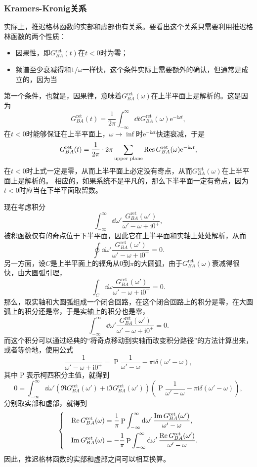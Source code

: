 \documentclass[hyperref, UTF8, a4paper]{ctexart}
\DeclareMathOperator{\primevalue}{P}
\newcommand*{\ii}{\mathrm{i}}
\newcommand*{\ee}{\mathrm{e}}
\newenvironment{bigcase}{\left\{\quad\begin{aligned}}{\end{aligned}\right.}
\begin{document}
\subsubsection{Kramers-Kronig关系}

实际上，推迟格林函数的实部和虚部也有关系。要看出这个关系只需要利用推迟格林函数的两个性质：
\begin{itemize}
    \item 因果性，即$G_{BA}^\text{ret}(t)$在$t<0$时为零；
    \item 频谱至少衰减得和$1/\omega$一样快，这个条件实际上需要额外的确认，但通常是成立的，因为当
\end{itemize}

第一个条件，也就是，因果律，意味着$G_{BA}^\text{ret}(\omega)$在上半平面上是解析的。这是因为
\[
    G_{BA}^\text{ret}(t) = \frac{1}{2\pi} \int_{-\infty}^\infty \dd{t} G_{BA}^\text{ret}(\omega) \ee^{-\ii\omega t},
\]
在$t<0$时能够保证在上半平面上，$\omega\to\inf$时$\ee^{-\ii \omega t}$快速衰减，于是
\[
    G_{BA}^\text{ret}(t) = \frac{1}{2\pi} \cdot 2 \pi \sum_\text{upper plane}  \Res G_{BA}^\text{ret}(\omega) \ee^{-\ii\omega t},
\]
在$t<0$时上式一定是零，从而上半平面上必定没有奇点，从而$G_{BA}^\text{ret}(\omega)$在上半平面上是解析的。
相应的，如果系统不是平凡的，那么下半平面一定有奇点，因为$t<0$时应当在下半平面取留数。

现在考虑积分
\[
    \int_{-\infty}^\infty \dd{\omega'} \frac{G_{BA}^\text{ret}(\omega')}{\omega' - \omega + \ii 0^+},
\]
被积函数仅有的奇点位于下半平面，因此它在上半平面和实轴上处处解析，从而
\[
    \oint \dd{\omega'} \frac{G_{BA}^\text{ret}(\omega')}{\omega' - \omega + \ii 0^+} = 0.
\]
另一方面，设$C$是上半平面上的辐角从$0$到$\pi$的大圆弧，由于$G_{BA}^\text{ret}(\omega)$衰减得很快，由大圆弧引理，
\[
    \int_C \dd{\omega} \frac{G_{BA}^\text{ret}(\omega')}{\omega' - \omega + \ii 0^+} = 0.
\]
那么，取实轴和大圆弧组成一个闭合回路，在这个闭合回路上的积分是零，在大圆弧上的积分还是零，于是实轴上的积分也是零，
\[
    \int_{-\infty}^\infty \dd{\omega'} \frac{G_{BA}^\text{ret}(\omega')}{\omega' - \omega + \ii 0^+} = 0.
\]
而这个积分可以通过经典的“将奇点移动到实轴而改变积分路径”的方法计算出来，或者等价地，使用公式
\[
    \frac{1}{\omega'-\omega+\ii 0^+} = \primevalue \frac{1}{\omega'-\omega} - \pi \ii \delta(\omega'-\omega),
\]
其中$\primevalue$表示柯西积分主值，就得到
\[
    0 = \int_{-\infty}^\infty \dd{\omega'} \left( \Re G_{BA}^\text{ret}(\omega') + \ii \Im G_{BA}^\text{ret}(\omega') \right) \left( \primevalue \frac{1}{\omega'-\omega} - \pi \ii \delta(\omega'-\omega) \right),
\]
分别取实部和虚部，就得到
\begin{equation}
    \begin{bigcase}
        \Re G_{BA}^\text{ret}(\omega) &= \frac{1}{\pi} \primevalue \int_{-\infty}^\infty \dd{\omega'} \frac{\Im G_{BA}^\text{ret}(\omega')}{\omega' - \omega}, \\
        \Im G_{BA}^\text{ret}(\omega) &= - \frac{1}{\pi} \primevalue \int_{-\infty}^\infty \dd{\omega'} \frac{\Re G_{BA}^\text{ret}(\omega')}{\omega' - \omega}.
    \end{bigcase}
\end{equation}
因此，推迟格林函数的实部和虚部之间可以相互换算。
\end{document}
